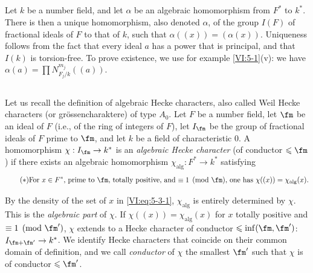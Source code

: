 \subsection{}\label{VI:5-2}

Let $k$ be a number field, and let $\alpha$ be an algebraic homomorphism 
from $F^\ast$ to $k^\ast$. There is then a unique 
homomorphism, also denoted $\alpha$, of the group $I(F)$ 
of fractional ideals of $F$ to that of $k$, such that $\alpha((x))=(\alpha(x))$. 
Uniqueness follows from the fact that every ideal $a$ has a power that is 
principal, and that $I(k)$ is torsion-free. To prove 
existence, we use for example \ref{VI:5-1}(v): we have 
$\alpha(a) = \prod N_{F_j/k}^{m_j}((a))$. 





\subsection{}\label{VI:5-3}

Let us recall the definition of algebraic Hecke characters, also called 
Weil Hecke characters (or gr\"ossencharaktere) of type $A_0$. Let $F$ be 
a number field, let $\fm$ be an ideal of $F$ (i.e., of the ring of integers of 
$F$), let $I_\fm$ be the group of fractional ideals of $F$ prime to $\fm$, 
and let $k$ be a field of characteristic $0$. A homomorphism 
$\chi:I_\fm \to k^\ast$ is an \emph{algebraic Hecke character} (of 
conductor $\leqslant \fm$) if there exists an algebraic homomorphism 
$\chi_\text{alg}:F^\ast \to k^\ast$ satisfying 
\begin{equation*}\tag{$*$}\label{VI:eq:5-3-1}
\text{For $x\in F^\ast$, prime to $\fm$, totally positive, and 
$\equiv 1\pmod\fm$, one has $\chi((x))=\chi_\text{alg}(x)$.}
\end{equation*}

By the density of the set of $x$ in \eqref{VI:eq:5-3-1}, $\chi_\text{alg}$ 
is entirely determined by $\chi$. This is the \emph{algebraic part} 
of $\chi$. If $\chi((x))=\chi_\text{alg}(x)$ for $x$ totally positive and 
$\equiv 1\pmod{\fm'}$, $\chi$ extends to a Hecke character of 
conductor $\leqslant \inf(\fm,\fm')$: $I_{\fm+\fm'}\to k^\ast$. We 
identify Hecke characters that coincide on their common domain of 
definition, and we call \emph{conductor} of $\chi$ the smallest $\fm'$ 
such that $\chi$ is of conductor $\leqslant \fm'$. 





